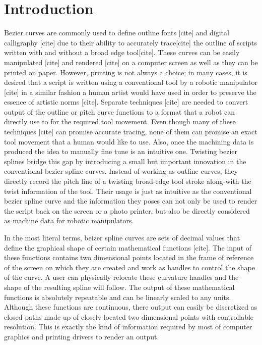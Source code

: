 \section{Introduction}
\label{Chapter:Introduction}
{
    Bezier curves are commonly used to define outline fonts [cite] and digital calligraphy [cite] due to their ability to accurately trace[cite] the outline of scripts written with and without a broad edge tool[cite]. These curves can be easily manipulated [cite] and rendered [cite] on a computer screen as well as they can be printed on paper. However, printing is not always a choice; in many cases, it is desired that a script is written using a conventional tool by a robotic manipulator [cite] in a similar fashion a human artist would have used in order to preserve the essence of artistic norms [cite]. Separate techniques [cite] are needed to convert output of the outline or pitch curve functions to a format that a robot can directly use to for the required tool movement. Even though many of these techniques [cite] can promise accurate tracing, none of them can promise an exact tool movement that a human would like to use. Also, once the machining data is produced the idea to manually fine tune is an intuitive one. Twisting bezier splines bridge this gap by introducing a small but important innovation in the conventional bezier spline curves. Instead of working as outline curves, they directly record the pitch line of a twisting broad-edge tool stroke along-with the twist information of the tool. Their usage is just as intuitive as the conventional bezier spline curve and the information they poses can not only be used to render the script back on the screen or a photo printer, but also be directly considered as machine data for robotic manipulators.

    In the most literal terms, beizer spline curves are sets of decimal values that define the graphical shape of certain mathematical functions [cite]. The input of these functions contains two dimensional points located in the frame of reference of the screen on which they are created and work as handles to control the shape of the curve. A user can physically relocate these curvature handles and the shape of the resulting spline will follow. The output of these mathematical functions is absolutely repeatable and can be linearly scaled to any units. Although these functions are continuous, there output can easily be discretized as closed paths made up of closely located two dimensional points with controllable resolution. This is exactly the kind of information required by most of computer graphics and printing drivers to render an output.
    
}
